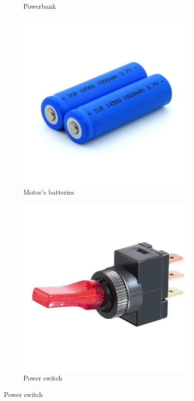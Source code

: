 \documentclass[12pt,a4paper]{article}
\begin{document}
\begin{large}
\begin{figure}[hb]
\begin{subfigure}{0.2\textwidth}
    \caption{Powerbank}
    \label{fig:right}
    \end{subfigure}
  \begin{subfigure}{0.2\textwidth}
    \centering
    \includegraphics[width = \textwidth]{images/batterie.jpg}
    \caption{Motor's batteries}
    \label{fig:right}
    \end{subfigure}
  \begin{subfigure}{0.2\textwidth}
    \centering
    \includegraphics[width = \textwidth]{images/switch.jpg}
    \caption{Power switch}
    \label{fig:right}
    \end{subfigure}
  \label{fig:combined}
\end{figure}


\end{large}
\end{document}
